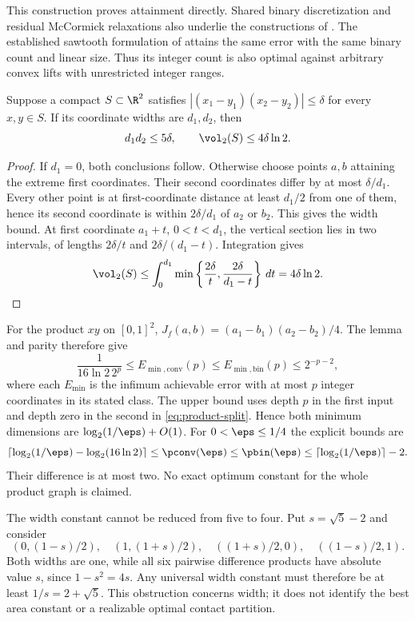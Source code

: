 This construction proves attainment directly. Shared binary discretization and residual McCormick relaxations also underlie the constructions of \citet{beach2024b}. The established sawtooth
formulation of \citet{beach2024} attains the same error with the same
binary count and linear size. Thus its integer count is also optimal
against arbitrary convex lifts with unrestricted integer ranges.

\begin{lemma}\label{lem:product-width}
Suppose a compact $S\subset\R^2$ satisfies
$|(x_1-y_1)(x_2-y_2)|\le\delta$ for every $x,y\in S$.
If its coordinate widths are $d_1,d_2$, then
\[
 d_1d_2\le5\delta,\qquad \vol_2(S)\le4\delta\ln2.
\]
\end{lemma}
\begin{proof}
If $d_1=0$, both conclusions follow. Otherwise choose points $a,b$
attaining the extreme first coordinates. Their second coordinates differ
by at most $\delta/d_1$. Every other point is at first-coordinate
distance at least $d_1/2$ from one of them, hence its second coordinate
is within $2\delta/d_1$ of $a_2$ or $b_2$. This gives the width bound.
At first coordinate $a_1+t$, $0<t<d_1$, the vertical section lies in
two intervals, of lengths $2\delta/t$ and $2\delta/(d_1-t)$.
Integration gives
\[
 \vol_2(S)\le
 \int_0^{d_1}\min\left\{\frac{2\delta}{t},
                    \frac{2\delta}{d_1-t}\right\}\,dt
 =4\delta\ln2.
\]
\end{proof}

For the product $xy$ on $[0,1]^2$, $J_f(a,b)=(a_1-b_1)(a_2-b_2)/4$.
The lemma and parity therefore give
\begin{equation}\label{eq:product-finite}
 \frac{1}{16\ln2\,2^p}\le E_{
\min,\mathrm{conv}}(p)\le E_{\min,\mathrm{bin}}(p)\le2^{-p-2},
\end{equation}
where each $E_{\min}$ is the infimum achievable error with at most $p$
integer coordinates in its stated class. The upper bound uses depth
$p$ in the first input and depth zero in the second in
\eqref{eq:product-split}. Hence both minimum dimensions are
$\log_2(1/\eps)+O(1)$. For $0<\eps\le1/4$ the explicit bounds are
\[
 \left\lceil\log_2(1/\eps)-\log_2(16\ln2)\right\rceil
 \le\pconv(\eps)\le\pbin(\eps)
 \le\lceil\log_2(1/\eps)\rceil-2.
\]
Their difference is at most two. No exact optimum constant for the
whole product graph is claimed.

The width constant cannot be reduced from five to four. Put
$s=\sqrt5-2$ and consider
\[
 (0,(1-s)/2),\quad (1,(1+s)/2),\quad
 ((1+s)/2,0),\quad ((1-s)/2,1).
\]
Both widths are one, while all six pairwise difference products have
absolute value $s$, since $1-s^2=4s$. Any universal width constant must
therefore be at least $1/s=2+\sqrt5$. This obstruction concerns width;
it does not identify the best area constant or a realizable optimal
contact partition.

